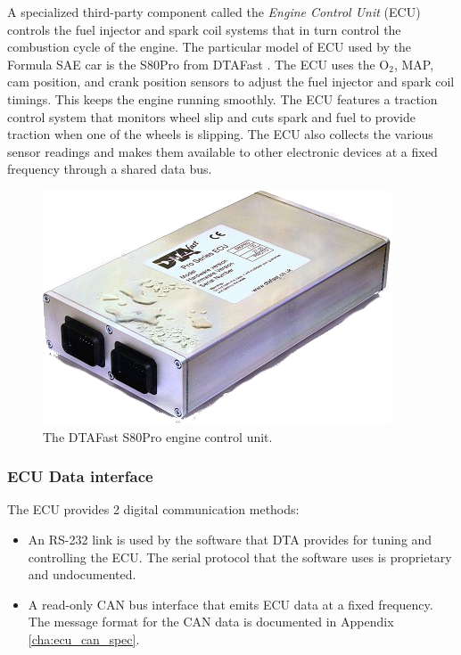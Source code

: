 A specialized third-party component called the \emph{Engine Control Unit} (ECU) controls the fuel injector and spark coil systems that in turn control the combustion cycle of the engine. The particular model of ECU used by the Formula SAE car is the S80Pro from DTAFast \cite{s80pro}. The ECU uses the O$_{2}$, MAP, cam position, and crank position sensors to adjust the fuel injector and spark coil timings. This keeps the engine running smoothly. The ECU features a traction control system that monitors wheel slip and cuts spark and fuel to provide traction when one of the wheels is slipping. The ECU also collects the various sensor readings and makes them available to other electronic devices at a fixed frequency through a shared data bus. 

\begin{figure}[H]
	\centering
	 	\includegraphics[scale=0.5]{Figures/s80.png}
    \caption{The DTAFast S80Pro engine control unit.}
    \label{fig:s80pro_product}
\end{figure}

\subsubsection{ECU Data interface}
\label{sec:ecu_data} 

The ECU provides 2 digital communication methods:
\begin{itemize}
 \item An RS-232 link is used by the software that DTA provides for tuning and controlling the ECU. The serial protocol that the software uses is proprietary and undocumented.
 \item A read-only CAN bus interface that emits ECU data at a fixed frequency. The message format for the CAN data is documented in Appendix \ref{cha:ecu_can_spec}.
\end{itemize}
 
